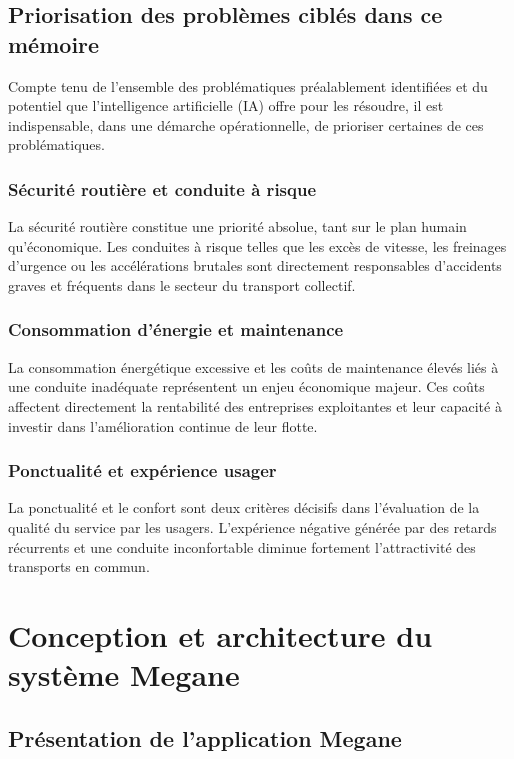 \documentclass[a4paper, 12pt]{book}
\begin{document}
\section{Priorisation des problèmes ciblés dans ce mémoire}

Compte tenu de l'ensemble des problématiques préalablement identifiées et du potentiel que l'intelligence artificielle (IA) offre pour les résoudre, il est indispensable, dans une démarche opérationnelle, de prioriser certaines de ces problématiques.

\subsection{Sécurité routière et conduite à risque}
La sécurité routière constitue une priorité absolue, tant sur le plan humain qu'économique. Les conduites à risque telles que les excès de vitesse, les freinages d'urgence ou les accélérations brutales sont directement responsables d'accidents graves et fréquents dans le secteur du transport collectif.

\subsection{Consommation d'énergie et maintenance}
La consommation énergétique excessive et les coûts de maintenance élevés liés à une conduite inadéquate représentent un enjeu économique majeur. Ces coûts affectent directement la rentabilité des entreprises exploitantes et leur capacité à investir dans l'amélioration continue de leur flotte.

\subsection{Ponctualité et expérience usager}
La ponctualité et le confort sont deux critères décisifs dans l'évaluation de la qualité du service par les usagers. L'expérience négative générée par des retards récurrents et une conduite inconfortable diminue fortement l'attractivité des transports en commun.

\chapter{Conception et architecture du système Megane}

\section{Présentation de l'application Megane}
\end{document}

